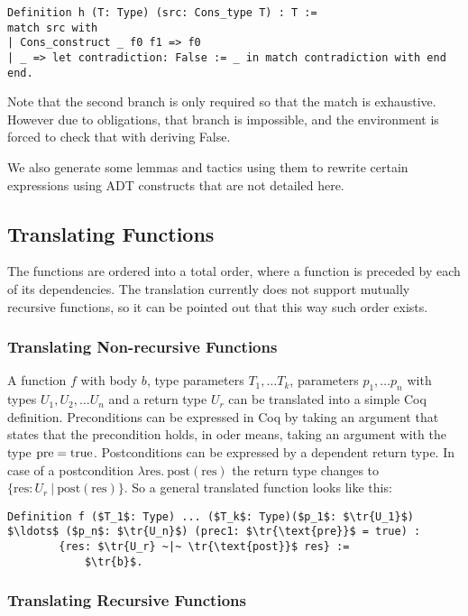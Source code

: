 \begin{lstlisting}[style=myCoqstyle]  
Definition h (T: Type) (src: Cons_type T) : T :=
match src with
| Cons_construct _ f0 f1 => f0
| _ => let contradiction: False := _ in match contradiction with end
end. 
\end{lstlisting}

Note that the second branch is only required so that the match is exhaustive. However due to obligations, that branch is impossible, and the environment is forced to check that with deriving False. 

We also generate some lemmas and tactics using them to rewrite certain expressions using ADT constructs that are not detailed here. %


\subsection{Translating Functions}

The functions are ordered into a total order, where a function is preceded by each of its dependencies. The translation currently does not support mutually recursive functions, so it can be pointed out that this way such order exists.

\subsubsection{Translating Non-recursive Functions}

A function $f$ with body $b$, type parameters $T_1, \ldots T_k$, parameters $p_1, \ldots p_n$ with types $U_1, U_2, \ldots U_n$ and a return type $U_r$ can be translated into a simple Coq definition.
%
Preconditions can be expressed in Coq by taking an argument that states that the precondition holds, in oder means, taking an argument with the type $\text{pre} = \text{true}$.
%
Postconditions can be expressed by a dependent return type. In case of a postcondition  $\lambda  \text{res}. ~\text{post}( \text{res})$ the return type changes to $\{\text{res}: U_r ~|~ \text{post}( \text{res})\}$. 
%
So a general translated function looks like this:
\begin{lstlisting}[style=myCoqstyle]  
Definition f ($T_1$: Type) ... ($T_k$: Type)($p_1$: $\tr{U_1}$) $\ldots$ ($p_n$: $\tr{U_n}$) (prec1: $\tr{\text{pre}}$ = true) : 
		{res: $\tr{U_r} ~|~ \tr{\text{post}}$ res} :=
			$\tr{b}$.
\end{lstlisting}

\subsubsection{Translating Recursive Functions}

